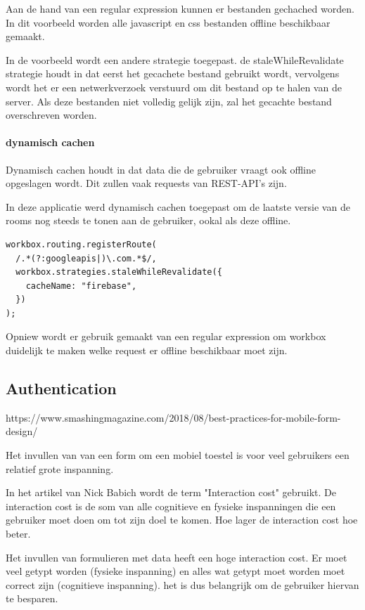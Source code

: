 			Aan de hand van een regular expression kunnen er bestanden gechached worden. In dit voorbeeld worden alle javascript en css bestanden offline beschikbaar gemaakt.
			
			In de voorbeeld wordt een andere strategie toegepast. de staleWhileRevalidate strategie houdt in dat eerst het gecachete bestand gebruikt wordt, vervolgens wordt het er een netwerkverzoek verstuurd om dit bestand op te halen van de server. Als deze bestanden niet volledig gelijk zijn, zal het gecachte bestand overschreven worden.
			
					
		\paragraph{dynamisch cachen}
			Dynamisch cachen houdt in dat data die de gebruiker vraagt ook offline opgeslagen wordt. Dit zullen vaak requests van REST-API's zijn.
			
			In deze applicatie werd dynamisch cachen toegepast om de laatste versie van de rooms nog steeds te tonen aan de gebruiker, ookal als deze offline.
			
\begin{lstlisting}
workbox.routing.registerRoute(
  /.*(?:googleapis|)\.com.*$/,
  workbox.strategies.staleWhileRevalidate({
    cacheName: "firebase",
  })
);
\end{lstlisting}
		
			Opniew wordt er gebruik gemaakt van een regular expression om workbox duidelijk te maken welke request er offline beschikbaar moet zijn.

	\subsection{Authentication}
	
		https://www.smashingmagazine.com/2018/08/best-practices-for-mobile-form-design/
		
		Het invullen van van een form om een mobiel toestel is voor veel gebruikers een relatief grote inspanning.
		
		In het artikel van Nick Babich wordt de term "Interaction cost" gebruikt. De interaction cost is de som van alle cognitieve en fysieke inspanningen die een gebruiker moet doen om tot zijn doel te komen. Hoe lager de interaction cost hoe beter.
		
		Het invullen van formulieren met data heeft een hoge interaction cost. Er moet veel getypt worden (fysieke inspanning) en alles wat getypt moet worden moet correct zijn (cognitieve inspanning). het is dus belangrijk om de gebruiker hiervan te besparen.
		
